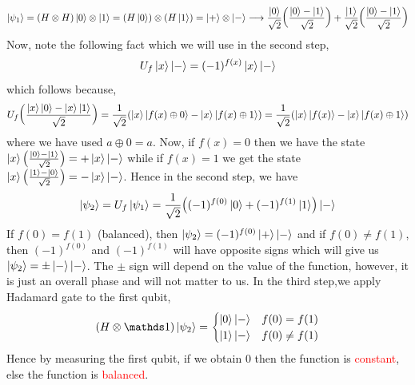 $$\ket{\psi_1} = (H\otimes H)\ket{0}\otimes \ket{1} = (H\ket{0})\otimes (H\ket{1}) = \ket{+}\otimes \ket{-}\longrightarrow \frac{\ket{0}}{\sqrt{2}}\qty(\frac{\ket{0}-\ket{1}}{\sqrt{2}}) + \frac{\ket{1}}{\sqrt{2}}\qty(\frac{\ket{0}-\ket{1}}{\sqrt{2}})$$
Now, note the following fact which we will use in the second step, 
$$U_f\ket{x}\ket{-} = (-1)^{f(x)}\ket{x}\ket{-}$$
which follows because,
\begin{align*}
    U_f\qty(\frac{\ket{x}\ket{0}-\ket{x}\ket{1}}{\sqrt{2}}) = \frac{1}{\sqrt{2}}\qty(\ket{x}\ket{f(x)\oplus 0} - \ket{x}\ket{f(x)\oplus 1}) = \frac{1}{\sqrt{2}}\qty(\ket{x}\ket{f(x)} - \ket{x}\ket{f(x)\oplus 1})
\end{align*}
where we have used $a\oplus 0 = a$. Now, if $f(x) = 0$ then we have the state $\ket{x}\qty(\frac{\ket{0}-\ket{1}}{\sqrt{2}}) = +\ket{x}\ket{-}$ while if $f(x)=1$ we get the state $\ket{x}\qty(\frac{\ket{1}-\ket{0}}{\sqrt{2}}) = - \ket{x}\ket{-}$. Hence in the second step, we have 
$$\ket{\psi_2} = U_f\ket{\psi_1} = \frac{1}{\sqrt{2}}\qty((-1)^{f(0)}\ket{0}+(-1)^{f(1)}\ket{1})\ket{-}$$
If $f(0)=f(1)$ (balanced), then $\ket{\psi_2} = (-1)^{f(0)}\ket{+}\ket{-}$ and if $f(0)\neq f(1)$, then $(-1)^{f(0)}$ and $(-1)^{f(1)}$ will have opposite signs which will give us $\ket{\psi_2} = \pm \ket{-}\ket{-}$. The $\pm$ sign will depend on the value of the function, however, it is just an overall phase and will not matter to us. In the third step,we apply Hadamard gate to the first qubit, 
$$(H\otimes \iden)\ket{\psi_2} = \begin{cases}
    \ket{0}\ket{-} & f(0) = f(1)\\
    \ket{1} \ket{-} & f(0)\neq f(1)
\end{cases}$$
Hence by measuring the first qubit, if we obtain $0$ then the function is \textcolor{red}{constant}, else the function is \textcolor{red}{balanced}. 